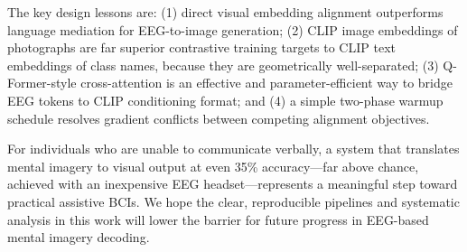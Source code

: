 \documentclass{article}
\begin{document}
The key design lessons are: (1) direct visual embedding alignment outperforms language mediation for EEG-to-image generation; (2) CLIP image embeddings of photographs are far superior contrastive training targets to CLIP text embeddings of class names, because they are geometrically well-separated; (3) Q-Former-style cross-attention is an effective and parameter-efficient way to bridge EEG tokens to CLIP conditioning format; and (4) a simple two-phase warmup schedule resolves gradient conflicts between competing alignment objectives.

For individuals who are unable to communicate verbally, a system that translates mental imagery to visual output at even 35\% accuracy---far above chance, achieved with an inexpensive EEG headset---represents a meaningful step toward practical assistive BCIs. We hope the clear, reproducible pipelines and systematic analysis in this work will lower the barrier for future progress in EEG-based mental imagery decoding.


%
%
%


\end{document}

